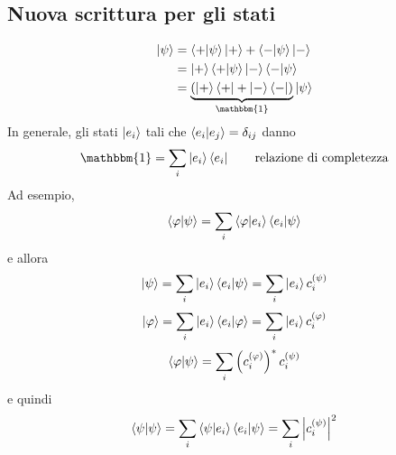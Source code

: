 \subsection{Nuova scrittura per gli stati}
\begin{align*}
  \ket{\psi}
  &= \braket{+|\psi} \ket{+} + \braket{-|\psi} \ket{-} \\
  &= \ket{+} \braket{+|\psi} \ket{-} \braket{-|\psi} \\
  &= \underbrace{
    \left( \ket{+} \bra{+} + \ket{-} \bra{-} \right)
  }_{\mathbbm{1}} \ket{\psi}
\end{align*}
In generale, gli stati \(\ket{e_i}\) tali che \(\braket{e_i|e_j}
= \delta_{ij}\) danno
\[
  \mathbbm{1} = \sum_i \ket{e_i}\bra{e_i}
  \qquad
  \text{relazione di completezza}
\]
Ad esempio,
\[
  \braket{\varphi|\psi} = \sum_i \braket{\varphi|e_i} \braket{e_i|\psi}
\]
e allora
\[
  \ket{\psi}
  = \sum_i \ket{e_i} \braket{e_i|\psi}
  = \sum_i \ket{e_i} c_i^{(\psi)}
\]
\[
  \ket{\varphi}
  = \sum_i \ket{e_i} \braket{e_i|\varphi}
  = \sum_i \ket{e_i} c_i^{(\varphi)}
\]
\[
  \braket{\varphi|\psi} = \sum_i \left( c_i^{(\varphi)} \right)^* c_i^{(\psi)}
\]
e quindi
\[
  \braket{\psi|\psi}
  = \sum_i \braket{\psi|e_i}\braket{e_i|\psi}
  = \sum_i \left| c_i^{(\psi)} \right|^2
\]